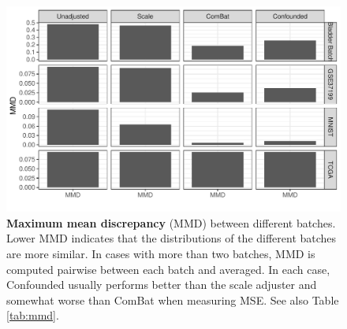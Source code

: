 \documentclass[11pt]{article}
\begin{document}
\begin{figure}
	\centering
	\includegraphics[width=\columnwidth]{figures/final/mmd.pdf}
	\caption[Maximum mean discrepancy (MMD)]{
		\textbf{Maximum mean discrepancy} (MMD) between different batches.
		Lower MMD indicates that the distributions of the different batches are more similar.
		In cases with more than two batches, MMD is computed pairwise between each batch and averaged.
		In each case, Confounded usually performs better than the scale adjuster and somewhat worse than ComBat when measuring MSE.
		See also Table \ref{tab:mmd}.
	}
	\label{fig:mmd}
\end{figure}
\begin{table}
	\centering
	
	\caption[Maximum mean discrepancy (MMD)]{
		\textbf{Maximum mean discrepancy} (MMD) comparing the distributions of the batches to each other after a given adjustment.
		Lower MMD indicates that the distributions of the different batches are more similar.
		In cases with more than two batches, MMD is computed pairwise between each batch and averaged.
		See also \figurename{} \ref{fig:mmd}.
	}
	\label{tab:mmd}
\end{table}
\end{document}
